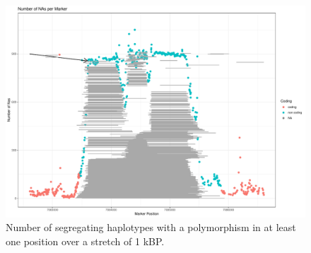 \begin{figure}[th]
\centering
\includegraphics[height=.55\textheight, width=1.1\textwidth]{Figures/plot_NAs_AT}
\decoRule
\caption[blabl]{Number of segregating haplotypes with a polymorphism in at least one position over a stretch of 1 kBP. }
\label{fig:chr_bla}
\end{figure}




